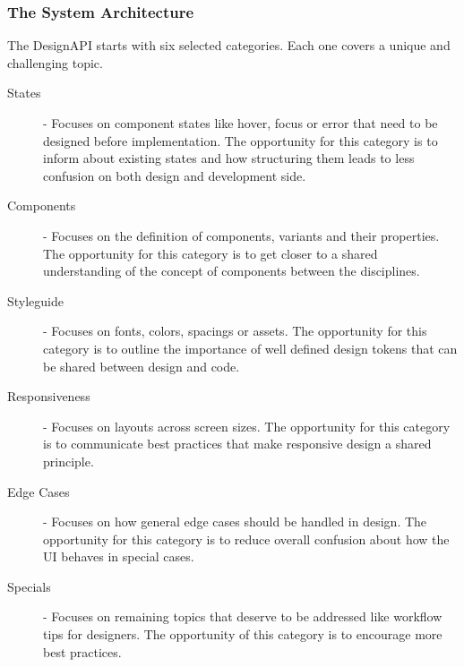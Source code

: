 \subsubsection{The System Architecture}
% 

%


The DesignAPI starts with six selected categories. Each one covers a unique and challenging topic.

\begin{description}
      \item[States] - Focuses on component states like hover, focus or error that need to be
            designed before implementation. The opportunity for this category is to inform about
            existing states and how structuring them leads to less confusion on both design and
            development side.

      \item[Components] - Focuses on the definition of components, variants and their properties.
            The opportunity for this category is to get closer to a shared understanding of the
            concept of components between the disciplines.

      \item[Styleguide] - Focuses on fonts, colors, spacings or assets. The opportunity for this
            category is to outline the importance of well defined design tokens that can be shared
            between design and code.

      \item[Responsiveness] - Focuses on layouts across screen sizes. The opportunity for this
            category is to communicate best practices that make responsive design a shared
            principle.

      \item[Edge Cases] - Focuses on how general edge cases should be handled in design. The
            opportunity for this category is to reduce overall confusion about how the UI behaves in
            special cases.

      \item[Specials] - Focuses on remaining topics that deserve to be addressed like workflow tips
            for designers. The opportunity of this category is to encourage more best practices.
\end{description}


